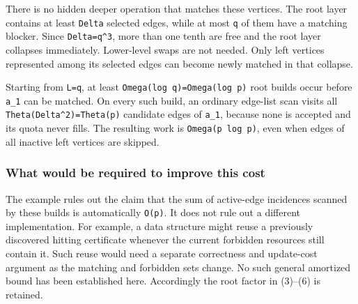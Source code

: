 There is no hidden deeper operation that matches these vertices. The root layer contains at least \texttt{Delta} selected edges, while at most \texttt{q} of them have a matching blocker. Since \texttt{Delta=q\^{}3}, more than one tenth are free and the root layer collapses immediately. Lower-level swaps are not needed. Only left vertices represented among its selected edges can become newly matched in that collapse.

Starting from \texttt{L=q}, at least \texttt{Omega(log\ q)=Omega(log\ p)} root builds occur before \texttt{a\_1} can be matched. On every such build, an ordinary edge-list scan visits all \texttt{Theta(Delta\^{}2)=Theta(p)} candidate edges of \texttt{a\_1}, because none is accepted and its quota never fills. The resulting work is \texttt{Omega(p\ log\ p)}, even when edges of all inactive left vertices are skipped.

\hypertarget{af-6a8212874a-what-would-be-required-to-improve-this-cost}{%
\subsubsection{What would be required to improve this cost}\label{af-6a8212874a-what-would-be-required-to-improve-this-cost}}

The example rules out the claim that the sum of active-edge incidences scanned by these builds is automatically \texttt{O(p)}. It does not rule out a different implementation. For example, a data structure might reuse a previously discovered hitting certificate whenever the current forbidden resources still contain it. Such reuse would need a separate correctness and update-cost argument as the matching and forbidden sets change. No such general amortized bound has been established here. Accordingly the root factor in (3)--(6) is retained.
